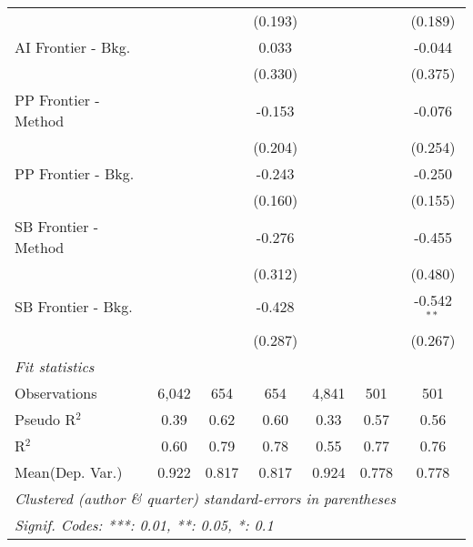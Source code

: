 \begin{tabular}{lcccccc}
                               &              &               & (0.193)     &              &               & (0.189)\\   
   AI Frontier - Bkg.          &              &               & 0.033       &              &               & -0.044\\   
                               &              &               & (0.330)     &              &               & (0.375)\\   
   PP Frontier - Method        &              &               & -0.153      &              &               & -0.076\\   
                               &              &               & (0.204)     &              &               & (0.254)\\   
   PP Frontier - Bkg.          &              &               & -0.243      &              &               & -0.250\\   
                               &              &               & (0.160)     &              &               & (0.155)\\   
   SB Frontier - Method        &              &               & -0.276      &              &               & -0.455\\   
                               &              &               & (0.312)     &              &               & (0.480)\\   
   SB Frontier - Bkg.          &              &               & -0.428      &              &               & -0.542$^{**}$\\   
                               &              &               & (0.287)     &              &               & (0.267)\\   
   \midrule
   \emph{Fit statistics}\\
   Observations                & 6,042        & 654           & 654         & 4,841        & 501           & 501\\  
   Pseudo R$^2$                & 0.39         & 0.62          & 0.60        & 0.33         & 0.57          & 0.56\\  
   R$^2$                       & 0.60         & 0.79          & 0.78        & 0.55         & 0.77          & 0.76\\  
Mean(Dep. Var.) & 0.922 & 0.817 & 0.817 & 0.924 & 0.778 & 0.778 \\
   \midrule \midrule
   \multicolumn{7}{l}{\emph{Clustered (author \& quarter) standard-errors in parentheses}}\\
   \multicolumn{7}{l}{\emph{Signif. Codes: ***: 0.01, **: 0.05, *: 0.1}}\\
\end{tabular}
\par\endgroup
